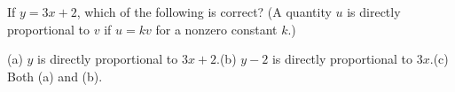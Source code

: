 If $y=3x+2$, which of the following is correct? (A quantity $u$ is directly proportional to $v$ if $u=kv$ for a nonzero constant $k$.)

(a) $y$ is directly proportional to $3x+2$.\qquad (b) $y-2$ is directly proportional to $3x$.\qquad (c) Both (a) and (b).

